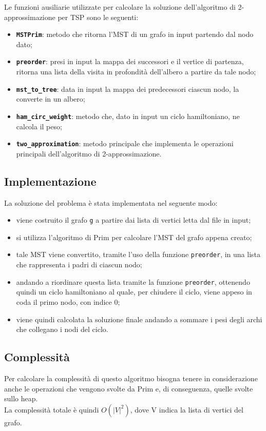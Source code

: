 	Le funzioni ausiliarie utilizzate per calcolare la soluzione dell'algoritmo di 2-approssimazione per TSP sono le seguenti:
	\begin{itemize}
		\item \texttt{\textbf{MSTPrim}}: metodo che ritorna l'MST di un grafo in input partendo dal nodo dato; 
		\item \texttt{\textbf{preorder}}: presi in input la mappa dei successori e il vertice di partenza, ritorna una lista della visita in profondità dell'albero a partire da tale nodo; 
		\item \texttt{\textbf{mst\_to\_tree}}: data in input la mappa dei predecessori ciascun nodo, la converte in un albero; 
		\item \texttt{\textbf{ham\_circ\_weight}}: metodo che, dato in input un ciclo hamiltoniano, ne calcola il peso;
		\item \texttt{\textbf{two\_approximation}}: metodo principale che implementa le operazioni principali dell'algoritmo di 2-approssimazione.
	\end{itemize}

\subsection{Implementazione}
	
	La soluzione del problema è stata implementata nel seguente modo:
	\begin{itemize}
		\item viene costruito il grafo \texttt{g} a partire dai lista di vertici letta dal file in input;
		\item si utilizza l'algoritmo di Prim per calcolare l'MST del grafo appena creato;
		\item tale MST viene convertito, tramite l'uso della funzione \texttt{preorder}, in una lista che rappresenta i padri di ciascun nodo;
		\item andando a riordinare questa lista tramite la funzione \texttt{preorder}, ottenendo quindi un ciclo hamiltoniano al quale, per chiudere il ciclo, viene appeso in coda il primo nodo, con indice 0;
		\item viene quindi calcolata la soluzione finale andando a sommare i pesi degli archi che collegano i nodi del ciclo.
	\end{itemize}
		
\subsection{Complessità}

	Per calcolare la complessità di questo algoritmo bisogna tenere in considerazione anche le operazioni che vengono svolte da Prim e, di conseguenza, quelle svolte sullo heap.\\
	La complessità totale è quindi $O(|V|^2)$, dove V indica la lista di vertici del grafo.

\pagebreak